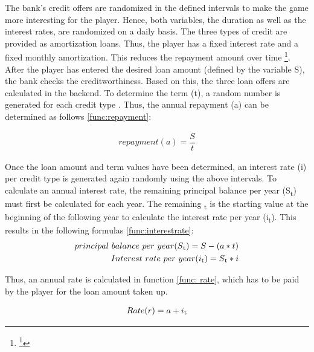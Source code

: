 The bank's credit offers are randomized in the defined intervals to make the game more interesting for the player. Hence, both variables, the duration as well as the interest rates, are randomized on a daily basis. The three types of credit are provided as amortization loans. Thus, the player has a fixed interest rate and a fixed monthly amortization. This reduces the repayment amount over time \footnote{\footnote{https://www.investopedia.com/terms/a/amortized\_loan.asp}}.
After the player has entered the desired loan amount (defined by the variable S), the bank checks the creditworthiness. Based on this, the three loan offers are calculated in the backend. To determine the term (t), a random number is generated for each credit type . Thus, the annual repayment (a) can be determined as follows \ref{func:repayment}:

\begin{equation}
\label{func:repayment}
\begin{aligned}
repayment (a)= {\dfrac{S}{t}}
\end{aligned}    
\end{equation}

Once the loan amount and term values have been determined, an interest rate (i) per credit type is generated again randomly using the above intervals. To calculate an annual interest rate, the remaining principal balance per year (S\textsubscript{t}) must first be calculated for each year. The remaining \textsubscript{t}  is the starting value at the beginning of the following year to calculate the interest rate per year (i\textsubscript{t}). This results in the following formulas \ref{func:interestrate}:
\begin{equation}
\label{func:interestrate}
\begin{aligned}
principal \ balance \ per \ year (S\textsubscript{t})= S- (a*t)\\
Interest \ rate \ per \ year (i\textsubscript{t}) = S\textsubscript{t} * i
\end{aligned}    
\end{equation}

Thus, an annual rate is calculated in function \ref{func: rate}, which has to be paid by the player for the loan amount taken up.

\begin{equation}
\label{func: rate}
\begin{aligned}
Rate (r)= a+ i\textsubscript{t}
\end{aligned}    
\end{equation}

